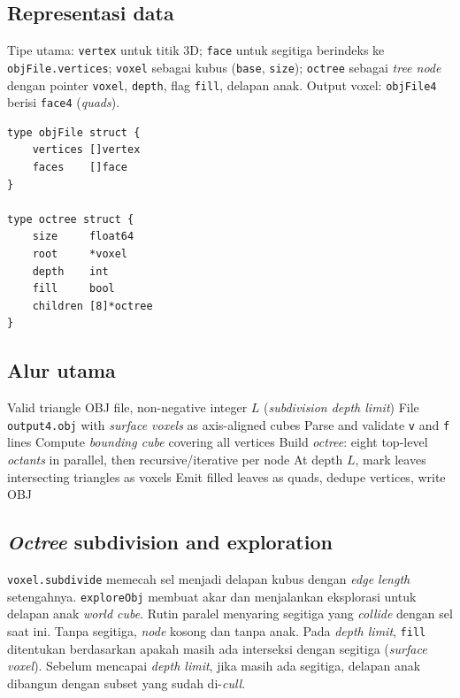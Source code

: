 \documentclass[11pt,a4paper]{article}
\begin{document}
\subsection{Representasi data}

Tipe utama: \texttt{vertex} untuk titik 3D; \texttt{face} untuk segitiga berindeks ke \texttt{objFile.vertices}; \texttt{voxel} sebagai kubus (\texttt{base}, \texttt{size}); \texttt{octree} sebagai \textit{tree node} dengan pointer \texttt{voxel}, \texttt{depth}, flag \texttt{fill}, delapan anak. Output voxel: \texttt{objFile4} berisi \texttt{face4} (\textit{quads}).

\begin{lstlisting}[caption={Core types (struct.go)}]
type objFile struct {
    vertices []vertex
    faces    []face
}

type octree struct {
    size     float64
    root     *voxel
    depth    int
    fill     bool
    children [8]*octree
}
\end{lstlisting}

\subsection{Alur utama}

\begin{algorithm}[H]
\caption{Octree-based voxelization (outline)}
\begin{algorithmic}[1]
\Require Valid triangle OBJ file, non-negative integer $L$ (\textit{subdivision depth limit})
\Ensure File \texttt{output4.obj} with \textit{surface voxels} as axis-aligned cubes
\State Parse and validate \texttt{v} and \texttt{f} lines
\State Compute \textit{bounding cube} covering all vertices
\State Build \textit{octree}: eight top-level \textit{octants} in parallel, then recursive/iterative per node
\State At depth $L$, mark leaves intersecting triangles as voxels
\State Emit filled leaves as quads, dedupe vertices, write OBJ
\end{algorithmic}
\end{algorithm}

\subsection{\textit{Octree} subdivision and exploration}

\texttt{voxel.subdivide} memecah sel menjadi delapan kubus dengan \textit{edge length} setengahnya. \texttt{exploreObj} membuat akar dan menjalankan eksplorasi untuk delapan anak \textit{world cube}. Rutin paralel menyaring segitiga yang \textit{collide} dengan sel saat ini. Tanpa segitiga, \textit{node} kosong dan tanpa anak. Pada \textit{depth limit}, \texttt{fill} ditentukan berdasarkan apakah masih ada interseksi dengan segitiga (\textit{surface voxel}). Sebelum mencapai \textit{depth limit}, jika masih ada segitiga, delapan anak dibangun dengan subset yang sudah di-\textit{cull}.
\end{document}
